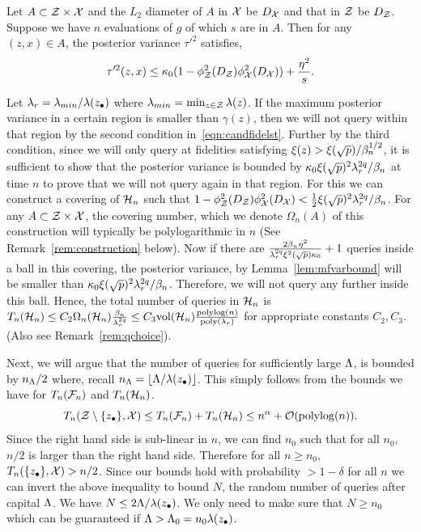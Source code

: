 \begin{lemma}
\label{lem:mfvarbound}
Let $A\subset\mathcal{Z}\times\mathcal{X}$ and the $L_2$ diameter of $A$ in $\mathcal{X}$ be
$D_{\mathcal{X}}$ and that in $\mathcal{Z}$ be $D_{\mathcal{Z}}$.
Suppose we have $n$ evaluations of $g$ of which $s$ are in $A$. 
Then for any $(z,x)\in A$, the posterior variance $\tau'^2$ satisfies, 
\[
\tau'^2(z,x) \leq \kappa_0(1 - \phi_{\mathcal{Z}}^2(D_{\mathcal{Z}}) \phi_{\mathcal{X}}^2(D_{\mathcal{X}})) + \frac{\eta^2}{s}.
\]
\end{lemma}
Let $\lambda_r = \lambda_{min}/\lambda(z_{\bullet})$ where $\lambda_{min} = \min_{z\in\mathcal{Z}}\lambda(z)$.
If the maximum posterior variance in a certain region is smaller than $\gamma(z)$,
then we will not query within that region by the second condition
in~\eqref{eqn:candfidelst}.
Further by the third condition, since we will only query at fidelities satisfying
 $\xi(z) > \xi(\sqrt{p})/\beta^{1/2}_n$,
it is sufficient to show that
the posterior variance is bounded by
$\kappa_0 \xi(\sqrt{p})^2 \lambda_r^{2q}/\beta_n$ at time $n$ 
to prove that we will not query again in that region.
For this we can construct a covering of $\mathcal{H}_n$ such that 
$1 - \phi_{\mathcal{Z}}^2(D_{\mathcal{Z}}) \phi_{\mathcal{X}}^2(D_{\mathcal{X}}) < \frac{1}{2}\xi(\sqrt{p})^2\lambda_r^{2q}/\beta_n$.
For any $A\subset\mathcal{Z}\times\mathcal{X}$, the covering number, which we denote $\Omega_n(A)$
of this construction
will typically be polylogarithmic in $n$ (See Remark~\ref{rem:construction} below).
Now if there are 
$\frac{2\beta_n\eta^2}{\lambda_r^{2q}\xi^2(\sqrt{p})\kappa_0} + 1$
queries inside a ball in this covering,
the posterior variance, by Lemma~\ref{lem:mfvarbound} will be smaller than
$\kappa_0 \xi(\sqrt{p})^2 \lambda_r^{2q}/\beta_n$. Therefore, 
we will not query any further inside this ball.
Hence, the total number of queries in $\mathcal{H}_n$ is
$T_n(\mathcal{H}_n) \leq C_2 \Omega_n(\mathcal{H}_n) \frac{\beta_n}{\lambda_r^{2q}}
\leq C_3 {\bf{\rm vol}}(\mathcal{H}_n) \frac{{\bf{\rm polylog}}(n)}{{\bf{\rm poly}}(\lambda_r)}$
for appropriate constants $C_2,C_3$.
(Also see Remark~\ref{rem:qchoice}).

Next, we will argue that the number of queries for sufficiently large $\Lambda$,
is bounded by $n_\Lambda/2$ where, recall $n_\Lambda = \lfloor \Lambda/\lambda(z_{\bullet}) \rfloor$.
This simply follows from the bounds we have for $T_n(\mathcal{F}_n)$ and $T_n(\mathcal{H}_n)$.
\[
T_n(\mathcal{Z}\setminus\{z_{\bullet}\},\mathcal{X})
\leq T_n(\mathcal{F}_n) + T_n(\mathcal{H}_n) \leq n^\alpha + \mathcal{O}({\bf{\rm polylog}}(n)).
\]
Since the right hand side is sub-linear in $n$, we can find $n_0$ such that
for all $n_0$, $n/2$ is larger than the right hand side.
Therefore for all $n\geq n_0$, $T_n(\{z_{\bullet}\},\mathcal{X}) > n/2$.
Since our bounds hold with probability $>1-\delta$ for all $n$ we can invert the
above inequality to bound $N$, the random number of queries after capital $\Lambda$.
We have $N\leq 2\Lambda/\lambda(z_{\bullet})$. We only need to make sure that $N\geq n_0$ which
can be guaranteed if $\Lambda > \Lambda_0 = n_0\lambda(z_{\bullet})$.

